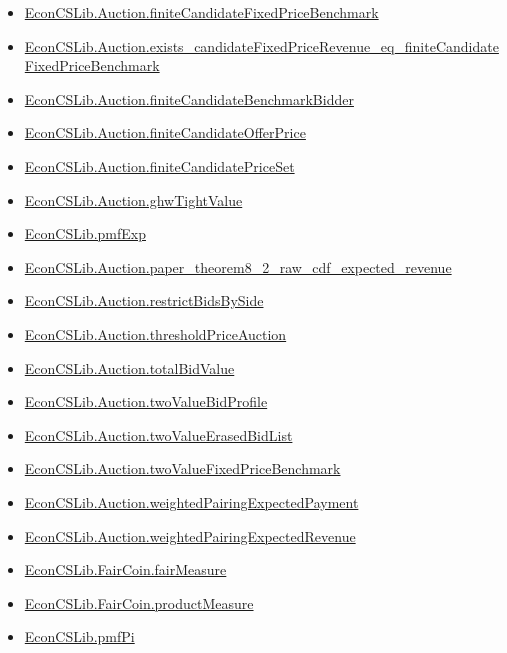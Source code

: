 \documentclass[10pt]{article}
\begin{document}
\begin{itemize}[leftmargin=1.2em]
\begin{itemize}[leftmargin=1.2em]
\item \hyperlink{library-prerequisite-93bfbf28000c81fe}{EconCSLib.Auction.finiteCandidateFixedPriceBenchmark}
\item \hyperlink{library-prerequisite-a9f91a7bc3820e14}{EconCSLib.Auction.exists\_candidateFixedPriceRevenue\_eq\_finiteCandidateFixedPriceBenchmark}
\item \hyperlink{library-prerequisite-63fbbdf8f5d20895}{EconCSLib.Auction.finiteCandidateBenchmarkBidder}
\item \hyperlink{library-prerequisite-4a020bcdd1308d1b}{EconCSLib.Auction.finiteCandidateOfferPrice}
\item \hyperlink{library-prerequisite-0e562ec650930ad9}{EconCSLib.Auction.finiteCandidatePriceSet}
\item \hyperlink{library-prerequisite-599eb5c29226e7e5}{EconCSLib.Auction.ghwTightValue}
\item \hyperlink{library-prerequisite-e5c7eedc40c11b7a}{EconCSLib.pmfExp}
\item \hyperlink{library-prerequisite-0011949331b54595}{EconCSLib.Auction.paper\_theorem8\_2\_raw\_cdf\_expected\_revenue}
\item \hyperlink{library-prerequisite-e0fd2b2fb7cd7939}{EconCSLib.Auction.restrictBidsBySide}
\item \hyperlink{library-prerequisite-dfc0f9ca8d4d3bc5}{EconCSLib.Auction.thresholdPriceAuction}
\item \hyperlink{library-prerequisite-0ee10456e4e5d33e}{EconCSLib.Auction.totalBidValue}
\item \hyperlink{library-prerequisite-70c2329a88c3a04f}{EconCSLib.Auction.twoValueBidProfile}
\item \hyperlink{library-prerequisite-f9f944b0fdcb16b5}{EconCSLib.Auction.twoValueErasedBidList}
\item \hyperlink{library-prerequisite-6306d037c75cd8a9}{EconCSLib.Auction.twoValueFixedPriceBenchmark}
\item \hyperlink{library-prerequisite-dbb37afde855adc6}{EconCSLib.Auction.weightedPairingExpectedPayment}
\item \hyperlink{library-prerequisite-53b1b7b2240a5658}{EconCSLib.Auction.weightedPairingExpectedRevenue}
\item \hyperlink{library-prerequisite-ed8d7c98cc166938}{EconCSLib.FairCoin.fairMeasure}
\item \hyperlink{library-prerequisite-d7cbf48d2b17bb56}{EconCSLib.FairCoin.productMeasure}
\item \hyperlink{library-prerequisite-b9805c0fe3b56f02}{EconCSLib.pmfPi}

\end{itemize}
\end{itemize}
\end{document}
